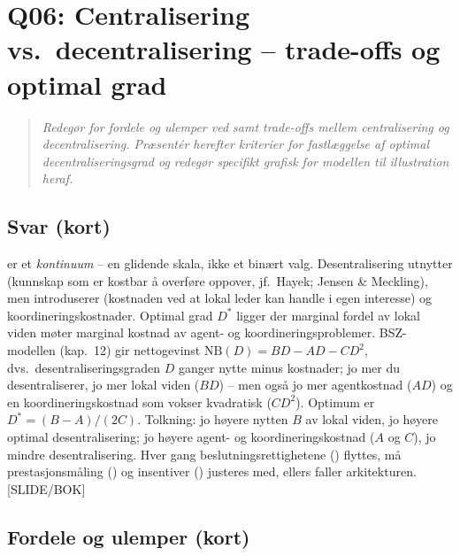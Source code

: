 \section{Q06: Centralisering vs.\ decentralisering -- trade-offs og optimal grad}\label{q:06}

\begin{quote}
\emph{Redegør for fordele og ulemper ved samt trade-offs mellem centralisering og decentralisering. Præsentér herefter kriterier for fastlæggelse af optimal decentraliseringsgrad og redegør specifikt grafisk for modellen til illustration heraf.}
\end{quote}

\subsection*{Svar (kort)}
 er et \emph{kontinuum} -- en glidende skala, ikke et binært valg. Desentralisering utnytter  (kunnskap som er kostbar å overføre oppover, jf.\ Hayek; Jensen \& Meckling), men introduserer  (kostnaden ved at lokal leder kan handle i egen interesse) og koordineringskostnader. Optimal grad $D^{*}$ ligger der marginal fordel av lokal viden møter marginal kostnad av agent- og koordineringsproblemer. BSZ-modellen (kap.\ 12) gir nettogevinst $\mathrm{NB}(D) = BD - AD - CD^{2}$, dvs.\ desentraliseringsgraden $D$ ganger nytte minus kostnader; jo mer du desentraliserer, jo mer lokal viden ($BD$) -- men også jo mer agentkostnad ($AD$) og en koordineringskostnad som vokser kvadratisk ($CD^{2}$). Optimum er $D^{*} = (B-A)/(2C)$. Tolkning: jo høyere nytten $B$ av lokal viden, jo høyere optimal desentralisering; jo høyere agent- og koordineringskostnad ($A$ og $C$), jo mindre desentralisering. Hver gang beslutningsrettighetene (\SOne) flyttes, må prestasjonsmåling (\STwo) og insentiver (\SThree) justeres med, ellers faller arkitekturen. [SLIDE/BOK]

\subsection*{Fordele og ulemper (kort)}

